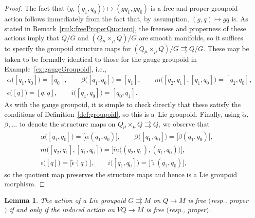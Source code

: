 \documentclass[pdftex]{sigma}
\numberwithin{equation}{section}
\newtheorem{Lemma}[Theorem]{Lemma}
\begin{document}
\begin{proof} The fact that $ \bigl( g, ( q _1 , q _0 )\bigr) \mapsto ( g q _1 , g q _0 ) $ is a free and proper groupoid action follows immediately from the fact that, by assumption, $ ( g, q) \mapsto g q $ is. As stated in Remark~\ref{rmk:freeProperQuotient}, the freeness and properness of these actions imply that $ Q / G $ and $ (Q \mathbin{ _\mu \times _\mu } Q)/G $ are smooth manifolds, so it suf\/f\/ices to specify the groupoid structure maps for $ (Q \mathbin{ _\mu \times _\mu } Q)/G \rightrightarrows Q / G $. These may be taken to be formally identical to those for the gauge groupoid in Example~\ref{ex:gaugeGroupoid}, i.e.,
 \begin{gather*}
 \alpha \bigl( [ q _1 , q _0 ] \bigr) = [q _0] , \qquad \beta \bigl( [ q _1, q _0 ] \bigr) = [q _1] , \qquad m \bigl( [q _2 , q
 _1 ] , [ q _1 , q _0 ] \bigr) = [ q _2 , q _0 ] ,\\
 \epsilon \bigl( [q] \bigr) = [ q, q ] , \qquad i \bigl( [ q _1 , q _0] \bigr) = [q _0, q _1].
 \end{gather*}
As with the gauge groupoid, it is simple to check directly that these satisfy the conditions of Def\/inition~\ref{def:groupoid}, so this is a~Lie groupoid. Finally, using $ \widetilde{ \alpha } $, $ \widetilde{ \beta } , \ldots $ to denote the structure maps on $ Q \mathbin{ _\mu \times _\mu } Q \rightrightarrows Q $, we observe that
 \begin{gather*}
\alpha \bigl( [ q _1 , q _0 ] \bigr) = \bigl[ \widetilde{ \alpha } ( q _1, q _0 ) \bigr] , \qquad \beta \bigl( [ q _1, q _0 ] \bigr) = \bigl[
\widetilde{ \beta } ( q _1, q _0 ) \bigr] , \\
 m \bigl( [q _2 , q _1 ] , [ q _1 , q _0 ] \bigr) = \bigl[ \widetilde{ m } \bigl((q _2, q _1), (q_1, q _0 ) \bigr) \bigr] ,\\
\epsilon \bigl( [q] \bigr) = \bigl[ \widetilde{ \epsilon } (q) \bigr] , \qquad i \bigl( [ q _1 , q _0] \bigr) = \bigl[\widetilde{ \imath } (q _1, q _0 ) \bigr] ,
 \end{gather*}
so the quotient map preserves the structure maps and hence is a Lie groupoid morphism.
\end{proof}

\begin{Lemma} \label{lem:freeProper}
The action of a Lie groupoid $ G \rightrightarrows M $ on $Q \rightarrow M$ is free $($resp., proper$)$ if and only if the induced action on $ V Q \rightarrow M $ is free $($resp., proper$)$.
\end{Lemma}
\end{document}
